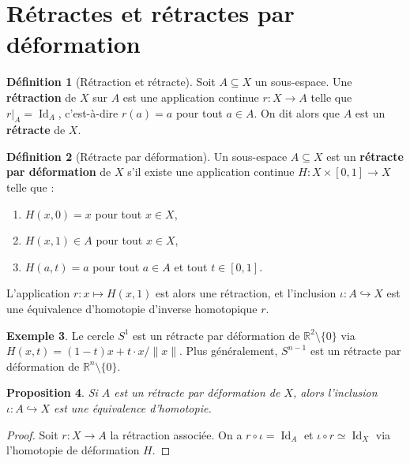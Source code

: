 \documentclass[12pt,a4paper,openany]{book}
\theoremstyle{definition}
\newtheorem{definition}{Définition}[chapter]
\newtheorem{exemple}[definition]{Exemple}
\theoremstyle{plain}
\newtheorem{proposition}[definition]{Proposition}
\theoremstyle{remark}
\newcommand{\R}{\mathbb{R}}
\DeclareMathOperator{\Id}{Id}
\begin{document}
\section{Rétractes et rétractes par déformation}\label{sec:retractes}

\begin{definition}[Rétraction et rétracte]\label{def:retracte}
Soit $A \subseteq X$ un sous-espace. Une \textbf{rétraction} de $X$ sur $A$ est
une application continue $r : X \to A$ telle que $r|_A = \Id_A$, c'est-à-dire
$r(a) = a$ pour tout $a \in A$. On dit alors que $A$ est un \textbf{rétracte}
de $X$.
\end{definition}

\begin{definition}[Rétracte par déformation]\label{def:retracte-deformation}
Un sous-espace $A \subseteq X$ est un \textbf{rétracte par déformation} de $X$
s'il existe une application continue $H : X \times [0,1] \to X$ telle que :
\begin{enumerate}[label=(\roman*)]
\item $H(x, 0) = x$ pour tout $x \in X$,
\item $H(x, 1) \in A$ pour tout $x \in X$,
\item $H(a, t) = a$ pour tout $a \in A$ et tout $t \in [0,1]$.
\end{enumerate}
L'application $r : x \mapsto H(x,1)$ est alors une rétraction, et l'inclusion
$\iota : A \hookrightarrow X$ est une équivalence d'homotopie d'inverse
homotopique $r$.
\end{definition}

\begin{exemple}\label{ex:retracte-Rn-0}
Le cercle $S^1$ est un rétracte par déformation de $\R^2 \setminus \{0\}$ via
$H(x,t) = (1-t)x + t \cdot x/\|x\|$. Plus généralement, $S^{n-1}$ est un
rétracte par déformation de $\R^n \setminus \{0\}$.
\end{exemple}

\begin{proposition}\label{prop:retracte-def-equiv-homotopie}
Si $A$ est un rétracte par déformation de $X$, alors l'inclusion
$\iota : A \hookrightarrow X$ est une équivalence d'homotopie.
\end{proposition}

\begin{proof}
Soit $r : X \to A$ la rétraction associée. On a $r \circ \iota = \Id_A$ et
$\iota \circ r \simeq \Id_X$ via l'homotopie de déformation $H$.
\end{proof}
\end{document}
